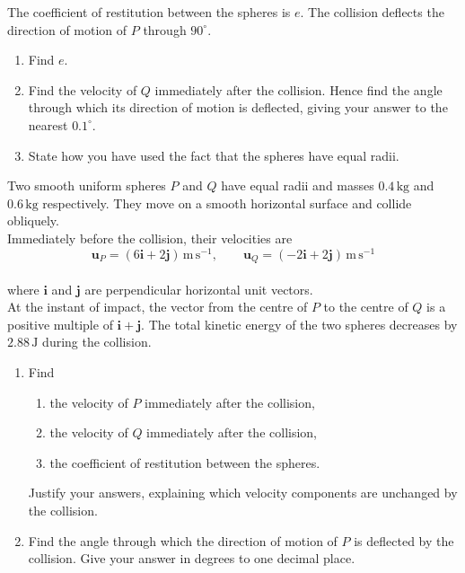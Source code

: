 \documentclass[leqno]{article}
\begin{document}
\begin{enumerate}[
  label=\textbf{\arabic*.},
  leftmargin=*,
  topsep=0pt,
  partopsep=0pt,
  parsep=0pt
]
The coefficient of restitution between the spheres is $e$. The collision deflects the direction of motion of $P$ through $90^\circ$. \\
\begin{enumerate}[label=\textbf{(\alph*)}]
\item Find $e$.  \\
\item Find the velocity of $Q$ immediately after the collision. Hence find the angle through which its direction of motion is deflected, giving your answer to the nearest $0.1^\circ$.  \\
\item State how you have used the fact that the spheres have equal radii.  \\
\end{enumerate}

\newpage

\questionitem

Two smooth uniform spheres $P$ and $Q$ have equal radii and masses $0.4\,\mathrm{kg}$ and $0.6\,\mathrm{kg}$ respectively. They move on a smooth horizontal surface and collide obliquely. \\

Immediately before the collision, their velocities are
\[
\mathbf{u}_P=(6\mathbf{i}+2\mathbf{j})\,\mathrm{m\,s^{-1}},\qquad \mathbf{u}_Q=(-2\mathbf{i}+2\mathbf{j})\,\mathrm{m\,s^{-1}}
\] \\
where $\mathbf{i}$ and $\mathbf{j}$ are perpendicular horizontal unit vectors. \\

At the instant of impact, the vector from the centre of $P$ to the centre of $Q$ is a positive multiple of $\mathbf{i}+\mathbf{j}$. The total kinetic energy of the two spheres decreases by $2.88\,\mathrm{J}$ during the collision. \\
\begin{enumerate}[label=\textbf{(\alph*)}]
\item Find
\begin{enumerate}[label=(\roman*)]
\item the velocity of $P$ immediately after the collision,
\item the velocity of $Q$ immediately after the collision,
\item the coefficient of restitution between the spheres.
\end{enumerate}
Justify your answers, explaining which velocity components are unchanged by the collision.  \\
\item Find the angle through which the direction of motion of $P$ is deflected by the collision. Give your answer in degrees to one decimal place.  \\
\end{enumerate}


\end{enumerate}
\end{document}
